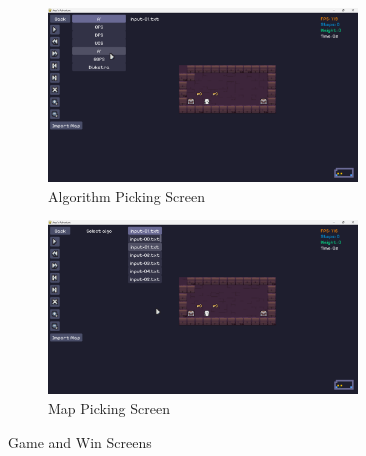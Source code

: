 \begin{figure}[!ht]
	\centering
	\begin{subfigure}{0.46\textwidth}
		\centering
		\includegraphics[width=0.9\textwidth]{imgs/screenshots/pick-algo.png}
		\caption{Algorithm Picking Screen}
	\end{subfigure}
	\hfill
	\begin{subfigure}{0.46\textwidth}
		\centering
		\includegraphics[width=0.9\textwidth]{imgs/screenshots/pick-map.png}
		\caption{Map Picking Screen}
	\end{subfigure}
	\caption{Game and Win Screens}
\end{figure}

